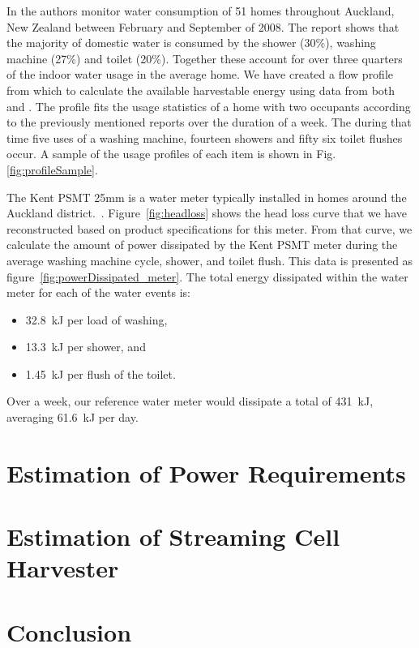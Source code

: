 \documentclass[10pt,final,journal]{IEEEtran}
\begin{document}
    In \cite{Heinrich2008} the authors monitor water consumption of 51 homes throughout Auckland, New Zealand between February and September of 2008.
    The report shows that the majority of domestic water is consumed by the shower (30\%), washing machine (27\%) and toilet (20\%).
    Together these account for over three quarters of the indoor water usage in the average home.
    We have created a flow profile from which to calculate the available harvestable energy using data from both \cite{Heinrich2008} and \cite{Heinrich2007}.
    The profile fits the usage statistics of a home with two occupants according to the previously mentioned reports over the duration of a week.
    The during that time five uses of a washing machine, fourteen showers and fifty six toilet flushes occur.
    A sample of the usage profiles of each item is shown in Fig. \ref{fig:profileSample}.

    The Kent PSMT 25mm is a water meter typically installed in homes around the Auckland district.~\cite{WatercareNewZealand2014}.
    Figure~\ref{fig:headloss} shows the head loss curve that we have reconstructed based on product specifications for this meter.
    From that curve, we calculate the amount of power dissipated by the Kent PSMT meter during the average washing machine cycle, shower, and toilet flush.
    This data is presented as figure~\ref{fig:powerDissipated_meter}.
    The total energy dissipated within the water meter for each of the water events is:
    \begin{itemize}
    \item \SI{32.8}{\kilo\joule} per load of washing,
    \item \SI{13.3}{\kilo\joule} per shower, and
    \item \SI{1.45}{\kilo\joule} per flush of the toilet.
    \end{itemize}
    Over a week, our reference water meter would dissipate a total of \SI{431}{\kilo\joule}, averaging \SI{61.6}{\kilo\joule} per day.
    
    \section{Estimation of Power Requirements}
    \label{sect:powerRequirements}
    

    
    \section{Estimation of Streaming Cell Harvester}
    \label{sect:harvesterSize}

    \section{Conclusion}
    
    
\end{document}
